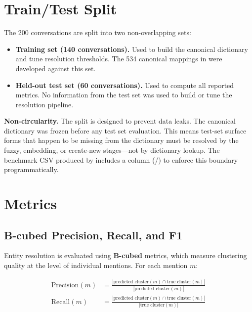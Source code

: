\section{Train/Test Split}
\label{sec:eval-split}

The 200 conversations are split into two non-overlapping sets:

\begin{itemize}
    \item \textbf{Training set (140 conversations).}  Used to build the
          canonical dictionary and tune resolution thresholds.  The 534
          canonical mappings in  were developed
          against this set.
    \item \textbf{Held-out test set (60 conversations).}  Used to compute
          all reported metrics.  No information from the test set was used
          to build or tune the resolution pipeline.
\end{itemize}

\medskip\noindent\textbf{Non-circularity.}  The split is designed to
prevent data leaks.  The canonical dictionary was frozen before any test
set evaluation.  This means test-set surface forms that happen to be
missing from the dictionary must be resolved by the fuzzy, embedding, or
create-new stages---not by dictionary lookup.  The benchmark CSV produced
by  includes a  column
(/) to enforce this boundary programmatically.


\section{Metrics}
\label{sec:eval-metrics}

\subsection{B-cubed Precision, Recall, and F1}

Entity resolution is evaluated using \textbf{B-cubed} metrics, which
measure clustering quality at the level of individual mentions.  For each
mention $m$:

\begin{align}
    \text{Precision}(m) &= \frac{|\text{predicted cluster}(m) \cap
        \text{true cluster}(m)|}{|\text{predicted cluster}(m)|} \\[4pt]
    \text{Recall}(m) &= \frac{|\text{predicted cluster}(m) \cap
        \text{true cluster}(m)|}{|\text{true cluster}(m)|}
\end{align}

